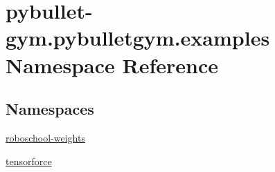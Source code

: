 \hypertarget{namespacepybullet-gym_1_1pybulletgym_1_1examples}{}\section{pybullet-\/gym.pybulletgym.\+examples Namespace Reference}
\label{namespacepybullet-gym_1_1pybulletgym_1_1examples}
\subsection*{Namespaces}
\begin{DoxyCompactItemize}
\item 
 \hyperlink{namespacepybullet-gym_1_1pybulletgym_1_1examples_1_1roboschool-weights}{roboschool-\/weights}
\item 
 \hyperlink{namespacepybullet-gym_1_1pybulletgym_1_1examples_1_1tensorforce}{tensorforce}
\end{DoxyCompactItemize}
